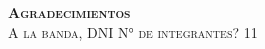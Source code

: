 \huge
\scshape
\textbf{Agradecimientos}\\

\normalsize\normalfont
A la banda, DNI N° de integrantes? 11